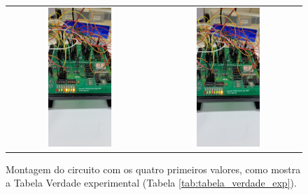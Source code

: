 \documentclass[a4,12pt]{horizon-theme}
\begin{document}
\begin{figure}[!ht]
\begin{tabular}{cc}
    \includegraphics[width=0.45\textwidth, trim={0 50cm 0 15cm}, clip]{circ_3.jpg} & \includegraphics[width=0.45\textwidth, trim={0 50cm 0 15cm}, clip]{circ_4.jpg}
  \end{tabular}
  \caption{Montagem do circuito com os quatro primeiros valores, como mostra a Tabela Verdade experimental (Tabela \ref{tab:tabela_verdade_exp}).}
  \label{fig:montagem}
\end{figure}
\end{document}
